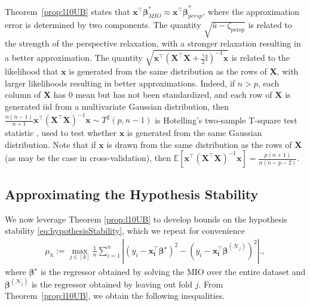 \documentclass[ijoc,noblindrev]{informs3} %
\newcommand{\ag}[1]{{\color{black}#1}}
\begin{document}
\begin{remark}[Intuition]\label{rem:intuition}
	Theorem~\ref{prop:l10UB} states that $\bm{x}^\top \bm{\beta}_{MIO}^*\approx\bm{x^\top\beta}_{persp}^*$, where the approximation error is determined by two components. The quantity $\sqrt{\bar u-\zeta_{\text{persp}}}$ is related to the strength of the perspective relaxation, with a stronger relaxation resulting in a better approximation. The quantity $\sqrt{\bm{x^\top}\left(\bm{X^\top X}+\frac{\gamma}{2}\mathbb{I}\right)^{-1}\bm{x}}$ is related to the likelihood that $\bm{x}$ is generated from the same distribution as the rows of $\bm{X}$, with larger likelihoods resulting in better approximations. Indeed, if $n>p$, each column of $\bm{X}$ has $0$ mean but has not been standardized, and each row of $\bm{X}$ is generated iid from a multivariate Gaussian distribution, then $\frac{n(n-1)}{n+1}\bm{x^\top}\left(\bm{X^\top X}\right)^{-1}\bm{x}\sim T^2(p, n-1)$ is Hotelling's two-sample T-square test statistic \citep{hotelling1931generalization}, used to test whether $\bm{x}$ is generated from the same Gaussian distribution. Note that if $\bm{x}$ is drawn from the same distribution as the rows of $\bm{X}$ (as may be the case in cross-validation), then $\mathbb{E}\left[\bm{x^\top}\left(\bm{X^\top X}\right)^{-1}\bm{x}\right]=\frac{p(n+1)}{n(n-p-2)}$.
\end{remark}

\iffalse
\subsection{Approximating the Hypothesis Stability} \label{ssec:genbounds2}

We now leverage Theorem \ref{prop:l10UB} to develop bounds on the hypothesis stability \eqref{eq:hypothesisStability}\ag{, which we repeat for convenience}
\begin{align*}
	\mu_h:=\max_{j\in [k]}\frac{1}{n}\sum_{i=1}^n \left\vert (y_i-\bm{x_i^\top\bm{\beta}^\star} )^2-(y_i-\bm{x_i^\top \beta}^{(\mathcal{N}_j)} )^2\right\vert.,
\end{align*}
\ag{where $\bm{\beta}^\star$ is the regressor obtained by solving the MIO over the entire dataset and $\bm{\beta}^{(\mathcal{N}_j)}$ is the regressor obtained by leaving out fold $j$. From Theorem~\ref{prop:l10UB}, we obtain the following inequalities.}
\end{document}
